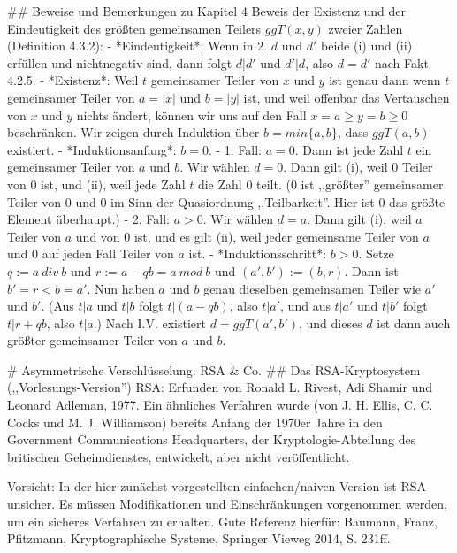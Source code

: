 \documentclass[a4paper]{article}
\begin{document}
\begin{multicols}{3}
{{{## Beweise und Bemerkungen zu Kapitel 4
Beweis der Existenz und der Eindeutigkeit des größten gemeinsamen Teilers $ggT(x,y)$ zweier Zahlen (Definition 4.3.2):
- *Eindeutigkeit*: Wenn in 2. $d$ und $d′$ beide (i) und (ii) erfüllen und nichtnegativ sind, dann folgt $d|d′$ und $d′|d$, also $d=d′$ nach Fakt 4.2.5.
- *Existenz*: Weil $t$ gemeinsamer Teiler von $x$ und $y$ ist genau dann wenn $t$ gemeinsamer Teiler von $a=|x|$ und $b=|y|$ ist, und weil offenbar das Vertauschen von $x$ und $y$ nichts ändert, können wir uns auf den Fall $x=a\geq y=b\geq 0$ beschränken. Wir zeigen durch Induktion über $b=min\{a,b\}$, dass $ggT(a,b)$ existiert.
- *Induktionsanfang*: $b=0$. 
  - 1. Fall: $a= 0$. Dann ist jede Zahl $t$ ein gemeinsamer Teiler von $a$ und $b$. Wir wählen $d=0$. Dann gilt (i), weil $0$ Teiler von $0$ ist, und (ii), weil jede Zahl $t$ die Zahl $0$ teilt. ($0$ ist ,,größter'' gemeinsamer Teiler von 0 und 0 im Sinn der Quasiordnung ,,Teilbarkeit''. Hier ist 0 das größte Element überhaupt.)
  - 2. Fall: $a >0$. Wir wählen $d=a$. Dann gilt (i), weil $a$ Teiler von $a$ und von 0 ist, und es gilt (ii), weil jeder gemeinsame Teiler von $a$ und 0 auf jeden Fall Teiler von $a$ ist.
- *Induktionsschritt*: $b>0$. Setze $q:=a\ div\ b$ und $r:=a-qb=a\ mod\ b$ und $(a′,b′):=(b,r)$. Dann ist $b′=r < b=a′$. Nun haben $a$ und $b$ genau dieselben gemeinsamen Teiler wie $a′$ und $b′$. (Aus $t|a$ und $t|b$ folgt $t|(a-qb)$, also $t|a′$, und aus $t|a′$ und $t|b′$ folgt $t|r+qb$, also $t|a$.) Nach I.V. existiert $d= ggT(a′,b′)$, und dieses $d$ ist dann auch größter gemeinsamer Teiler von $a$ und $b$.


# Asymmetrische Verschlüsselung: RSA & Co.
## Das RSA-Kryptosystem (,,Vorlesungs-Version'')
RSA: Erfunden von Ronald L. Rivest, Adi Shamir und Leonard Adleman, 1977. Ein ähnliches Verfahren wurde (von J. H. Ellis, C. C. Cocks und M. J. Williamson) bereits Anfang der 1970er Jahre in den Government Communications Headquarters, der Kryptologie-Abteilung des britischen Geheimdienstes, entwickelt, aber nicht veröffentlicht.

Vorsicht: In der hier zunächst vorgestellten einfachen/naiven Version ist RSA unsicher. Es müssen Modifikationen und Einschränkungen vorgenommen werden, um ein
sicheres Verfahren zu erhalten. Gute Referenz hierfür: Baumann, Franz, Pfitzmann, Kryptographische Systeme, Springer Vieweg 2014, S. 231ff.

}}}
\end{multicols}
\end{document}
